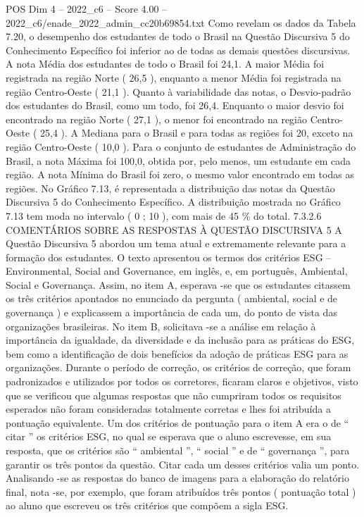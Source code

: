 \begin{textsample}{POS Dim 4 – 2022\_c6 – Score 4.00 – 2022\_c6/enade\_2022\_admin\_cc20b69854.txt}
Como revelam os dados da Tabela 7.20, o desempenho dos estudantes de todo o Brasil na Questão Discursiva 5 do Conhecimento Específico foi inferior ao de todas as demais questões discursivas.
A nota Média dos estudantes de todo o Brasil foi 24,1.
A maior Média foi registrada na região Norte ( 26,5 ), enquanto a menor Média foi registrada na região Centro-Oeste ( 21,1 ).
Quanto à variabilidade das notas, o Desvio-padrão dos estudantes do Brasil, como um todo, foi 26,4.
Enquanto o maior desvio foi encontrado na região Norte ( 27,1 ), o menor foi encontrado na região Centro-Oeste ( 25,4 ).
A Mediana para o Brasil e para todas as regiões foi 20, exceto na região Centro-Oeste ( 10,0 ).
Para o conjunto de estudantes de Administração do Brasil, a nota Máxima foi 100,0, obtida por, pelo menos, um estudante em cada região.
A nota Mínima do Brasil foi zero, o mesmo valor encontrado em todas as regiões.
No Gráfico 7.13, é representada a distribuição das notas da Questão Discursiva 5 do Conhecimento Específico.
A distribuição mostrada no Gráfico 7.13 tem moda no intervalo ( 0 ; 10 ), com mais de 45 \% do total. 7.3.2.6 COMENTÁRIOS SOBRE AS RESPOSTAS À QUESTÃO DISCURSIVA 5 A Questão Discursiva 5 abordou um tema atual e extremamente relevante para a formação dos estudantes.
O texto apresentou os termos dos critérios ESG – Environmental, Social and Governance, em inglês, e, em português, Ambiental, Social e Governança.
Assim, no item A, esperava -se que os estudantes citassem os três critérios apontados no enunciado da pergunta ( ambiental, social e de governança ) e explicassem a importância de cada um, do ponto de vista das organizações brasileiras.
No item B, solicitava -se a análise em relação à importância da igualdade, da diversidade e da inclusão para as práticas do ESG, bem como a identificação de dois benefícios da adoção de práticas ESG para as organizações.
Durante o período de correção, os critérios de correção, que foram padronizados e utilizados por todos os corretores, ficaram claros e objetivos, visto que se verificou que algumas respostas que não cumpriram todos os requisitos esperados não foram consideradas totalmente corretas e lhes foi atribuída a pontuação equivalente.
Um dos critérios de pontuação para o item A era o de “ citar ” os critérios ESG, no qual se esperava que o aluno escrevesse, em sua resposta, que os critérios são “ ambiental ”, “ social ” e de “ governança ”, para garantir os três pontos da questão.
Citar cada um desses critérios valia um ponto.
Analisando -se as respostas do banco de imagens para a elaboração do relatório final, nota -se, por exemplo, que foram atribuídos três pontos ( pontuação total ) ao aluno que escreveu os três critérios que compõem a sigla ESG.

\end{textsample}
